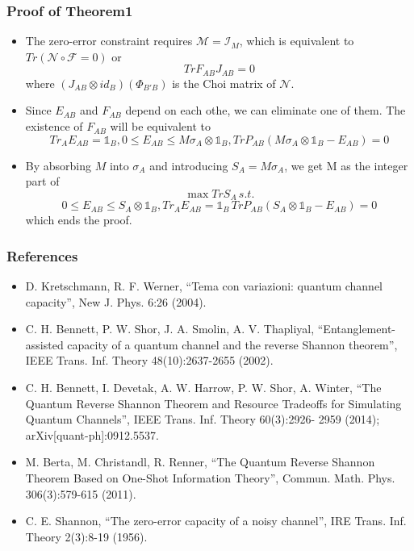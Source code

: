 \documentclass{beamer}
\begin{document}
\begin{frame}
\frametitle{Proof of Theorem1}
\begin{itemize}
\item The zero-error constraint requires $\mathcal{M}=\mathcal{I}_M$, which is equivalent to $Tr(\mathcal{N}\circ \mathcal{F}=0)$ or 
\[
TrF_{AB}J_{AB}=0
\]
where $(J_{AB}\otimes id_B)(\Phi_{B'B})$ is the Choi matrix of $\mathcal{N}$.
\item Since $E_{AB}$ and $F_{AB}$ depend on each othe, we can eliminate one of them. The existence of $F_{AB}$ will be equivalent to
\[
Tr_AE_{AB}=\mathds{1}_B,0\leq E_{AB}\leq M\sigma_A\otimes\mathds{1}_B, TrP_{AB}(M\sigma_A\otimes\mathds{1}_B-E_{AB})=0
\]
\item By absorbing $M$ into $\sigma_A$ and introducing $S_A=M\sigma_A$, we get M as the integer part of 
\[
\max TrS_A \, s.t.
\]
\[
0\leq E_{AB}\leq S_A\otimes\mathds{1}_B, Tr_A E_{AB}=\mathds{1}_B\, TrP_{AB}(S_A\otimes\mathds{1}_B-E_{AB})=0
\]
which ends the proof.
\end{itemize}
\end{frame}

\begin{frame}
\frametitle{References}

\begin{itemize}
\item D. Kretschmann, R. F. Werner, “Tema con variazioni: quantum channel capacity”, New J. Phys. 6:26
(2004).
\item C. H. Bennett, P. W. Shor, J. A. Smolin, A. V. Thapliyal, “Entanglement-assisted capacity of a quantum
channel and the reverse Shannon theorem”, IEEE Trans. Inf. Theory 48(10):2637-2655 (2002).
\item C. H. Bennett, I. Devetak, A. W. Harrow, P. W. Shor, A. Winter, “The Quantum Reverse Shannon Theorem and Resource Tradeoffs for Simulating Quantum Channels”, IEEE Trans. Inf. Theory 60(3):2926-
2959 (2014); arXiv[quant-ph]:0912.5537.
\item  M. Berta, M. Christandl, R. Renner, “The Quantum Reverse Shannon Theorem Based on One-Shot
Information Theory”, Commun. Math. Phys. 306(3):579-615 (2011).
\item C. E. Shannon, “The zero-error capacity of a noisy channel”, IRE Trans. Inf. Theory 2(3):8-19 (1956).

\end{itemize}
\end{frame}
\end{document}
